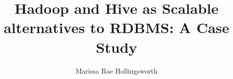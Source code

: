 \documentclass[project,Amit]{bsu-ms}  %
\title{Hadoop and Hive as Scalable alternatives to RDBMS: A Case Study}
\author{Marissa Rae Hollingsworth}
\begin{document}
\frontmatter  %
\buildFrontPages %



\mainmatter

%
%

%
%

%
%

%
%

%
%

%
%


\backmatter

%
%




%
%
\appendix







\finish  %
\end{document}

